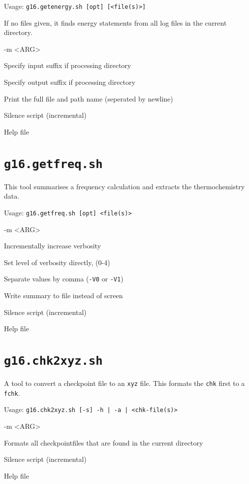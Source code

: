 \documentclass[   %
  final,          %
  a4paper,        %
  rscols=3,       %
  margin=1.0cm,   %
]{refsheet}
\begin{document}
Usage: \texttt{g16.getenergy.sh [opt] [<file(s)>]}

If no files given, it finds energy statements from all log files in the current directory.

\begin{rslisttt}{-m <ARG>}
  \item[-i <ARG>] Specify input suffix if processing directory
  \item[-o <ARG>] Specify output suffix if processing directory
  \item[-L      ] Print the full file and path name (seperated by newline)
  \item[-s      ] Silence script (incremental)
  \item[-h      ] Help file 
\end{rslisttt}

\section{\texttt{g16.getfreq.sh}}

This tool summarises a frequency calculation and extracts the thermochemistry data.

Usage: \texttt{g16.getfreq.sh [opt] <file(s)>}

\begin{rslisttt}{-m <ARG>}
  \item[-v      ] Incrementally increase verbosity
  \item[-V <INT>] Set level of verbosity directly, (0-4)
  \item[-c      ] Separate values by comma (\texttt{-V0} or \texttt{-V1})
  \item[-f <ARG>] Write summary to file instead of screen
  \item[-s      ] Silence script (incremental)
  \item[-h      ] Help file 
\end{rslisttt}

\section{\texttt{g16.chk2xyz.sh}}

A tool to convert a checkpoint file to an \texttt{xyz} file. 
This formats the \texttt{chk} first to a \texttt{fchk}.

Usage: \texttt{g16.chk2xyz.sh [-s] -h | -a | <chk-file(s)>}

\begin{rslisttt}{-m <ARG>}
  \item[-a      ] Formats all checkpointfiles that are found in the current directory
  \item[-s      ] Silence script (incremental)
  \item[-h      ] Help file 
\end{rslisttt}
\end{document}
